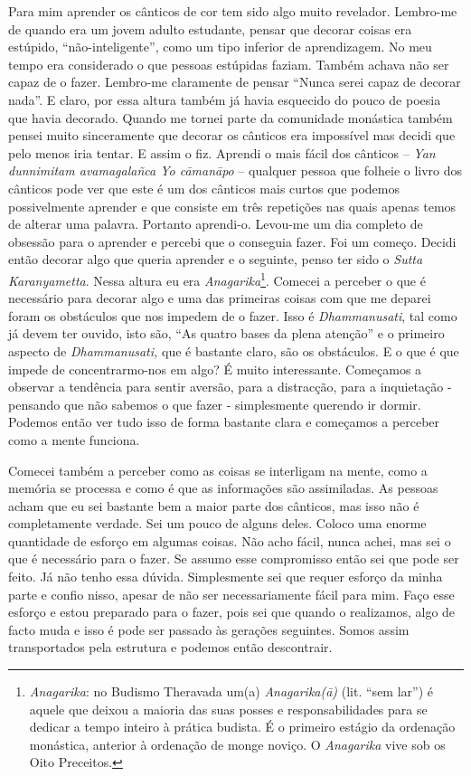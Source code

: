 Para mim aprender os cânticos de cor tem sido algo muito revelador.
Lembro-me de quando era um jovem adulto estudante, pensar que decorar
coisas era estúpido, ``não-inteligente'', como um tipo inferior de
aprendizagem. No meu tempo era considerado o que pessoas estúpidas
faziam. Também achava não ser capaz de o fazer. Lembro-me claramente de
pensar ``Nunca serei capaz de decorar nada''. E claro, por essa altura
também já havia esquecido do pouco de poesia que havia decorado. Quando
me tornei parte da comunidade monástica também pensei muito sinceramente
que decorar os cânticos era impossível mas decidi que pelo menos iria
tentar. E assim o fiz. Aprendi o mais fácil dos cânticos -- \emph{Yan
dunnimitam avamagalañca Yo cāmanāpo} -- qualquer pessoa que folheie o
livro dos cânticos pode ver que este é um dos cânticos mais curtos que
podemos possivelmente aprender e que consiste em três repetições nas
quais apenas temos de alterar uma palavra. Portanto aprendi-o. Levou-me
um dia completo de obsessão para o aprender e percebi que o conseguia
fazer. Foi um começo. Decidi então decorar algo que queria aprender e o
seguinte, penso ter sido o \emph{Sutta Karanyametta}. Nessa altura eu
era \emph{Anagarika}\footnote{%
  \emph{Anagarika}: no Budismo Theravada um(a) \emph{Anagarika(ā)}
  (lit. ``sem lar'') é aquele que deixou a maioria das suas posses e
  responsabilidades para se dedicar a tempo inteiro à prática budista. É o
  primeiro estágio da ordenação monástica, anterior à ordenação de monge
  noviço. O \emph{Anagarika} vive sob os Oito Preceitos.
}.
Comecei a perceber o que é necessário para
decorar algo e uma das primeiras coisas com que me deparei foram os
obstáculos que nos impedem de o fazer. Isso é \emph{Dhammanusati}, tal
como já devem ter ouvido, isto são, ``As quatro bases da plena atenção''
e o primeiro aspecto de \emph{Dhammanusati,} que é bastante claro, são
os obstáculos. E o que é que impede de concentrarmo-nos em algo? É muito
interessante. Começamos a observar a tendência para sentir aversão, para
a distracção, para a inquietação - pensando que não sabemos o que fazer
- simplesmente querendo ir dormir. Podemos então ver tudo isso de forma
bastante clara e começamos a perceber como a mente funciona.

Comecei também a perceber como as coisas se interligam na mente, como a
memória se processa e como é que as informações são assimiladas. As
pessoas acham que eu sei bastante bem a maior parte dos cânticos, mas
isso não é completamente verdade. Sei um pouco de alguns deles. Coloco
uma enorme quantidade de esforço em algumas coisas. Não acho fácil,
nunca achei, mas sei o que é necessário para o fazer. Se assumo esse
compromisso então sei que pode ser feito. Já não tenho essa dúvida.
Simplesmente sei que requer esforço da minha parte e confio nisso,
apesar de não ser necessariamente fácil para mim. Faço esse esforço e
estou preparado para o fazer, pois sei que quando o realizamos, algo de
facto muda e isso é pode ser passado às gerações seguintes. Somos assim
transportados pela estrutura e podemos então descontrair.

